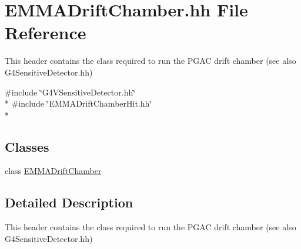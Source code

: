 \hypertarget{EMMADriftChamber_8hh}{\section{E\-M\-M\-A\-Drift\-Chamber.\-hh File Reference}
\label{EMMADriftChamber_8hh}
}


This header contains the class required to run the P\-G\-A\-C drift chamber (see also G4\-Sensitive\-Detector.\-hh)  


{\ttfamily \#include \char`\"{}G4\-V\-Sensitive\-Detector.\-hh\char`\"{}}\\*
{\ttfamily \#include \char`\"{}E\-M\-M\-A\-Drift\-Chamber\-Hit.\-hh\char`\"{}}\\*
\subsection*{Classes}
\begin{DoxyCompactItemize}
\item 
class \hyperlink{classEMMADriftChamber}{E\-M\-M\-A\-Drift\-Chamber}
\end{DoxyCompactItemize}


\subsection{Detailed Description}
This header contains the class required to run the P\-G\-A\-C drift chamber (see also G4\-Sensitive\-Detector.\-hh) 